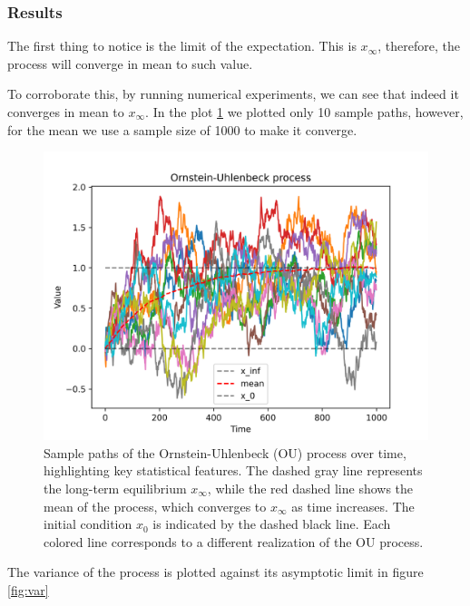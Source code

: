 \documentclass[a4paper,12pt]{article} %
\begin{document}
\subsubsection{Results}
The first thing to notice is the limit of the expectation. This is \(x_\infty \), therefore, the process will converge in mean to such value.

To corroborate this, by running numerical experiments, we can see that indeed it converges in mean to \(x_\infty \). In the plot \ref{fig:my_image} we plotted only 10 sample paths, however, for the mean we use a sample size of 1000 to make it converge.

\begin{figure}[h!]
    \centering
    \includegraphics[width=1\textwidth]{plots/ou_process.png} %
    \caption{Sample paths of the Ornstein-Uhlenbeck (OU) process over time, highlighting key statistical features. The dashed gray line represents the long-term equilibrium \( x_{\infty} \), while the red dashed line shows the mean of the process, which converges to \( x_{\infty} \) as time increases. The initial condition \( x_0 \) is indicated by the dashed black line. Each colored line corresponds to a different realization of the OU process.}
    \label{fig:my_image}
\end{figure}

The variance of the process is plotted against its asymptotic limit in figure \ref{fig:var}
\end{document}
